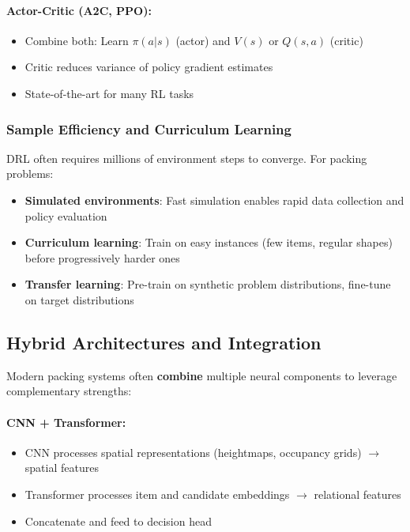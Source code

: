 \paragraph{Actor-Critic (A2C, PPO):}

\begin{itemize}
\item Combine both: Learn $\pi(a|s)$ (actor) and $V(s)$ or $Q(s, a)$ (critic)
\item Critic reduces variance of policy gradient estimates
\item State-of-the-art for many RL tasks
\end{itemize}

\subsubsection{Sample Efficiency and Curriculum Learning}

DRL often requires millions of environment steps to converge. For packing problems:

\begin{itemize}
\item \textbf{Simulated environments}: Fast simulation enables rapid data collection and policy evaluation
\item \textbf{Curriculum learning}: Train on easy instances (few items, regular shapes) before progressively harder ones
\item \textbf{Transfer learning}: Pre-train on synthetic problem distributions, fine-tune on target distributions
\end{itemize}


\subsection{Hybrid Architectures and Integration}

Modern packing systems often \textbf{combine} multiple neural components to leverage complementary strengths:

\paragraph{CNN + Transformer:}
\begin{itemize}
\item CNN processes spatial representations (heightmaps, occupancy grids) $\to$ spatial features
\item Transformer processes item and candidate embeddings $\to$ relational features
\item Concatenate and feed to decision head
\end{itemize}

